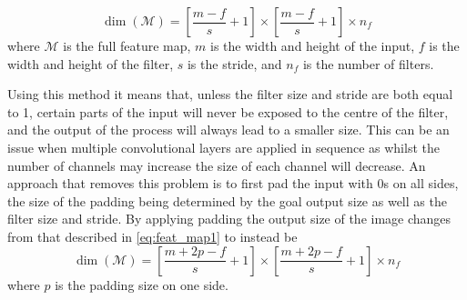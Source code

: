 \documentclass[12pt]{article}
\numberwithin{equation}{section}
\numberwithin{figure}{section}
\begin{document}
\begin{equation}
	\label{eq:feat_map1}
	\dim(\mathscr{M}) = \left[\frac{m-f}{s} +1 \right] \times \left[\frac{m-f}{s} +1 \right] \times n_{f}
\end{equation}
where $\mathscr{M}$ is the full feature map, $m$ is the width and height of the input, $f$ is the width and height of the filter, $s$ is the stride, and $n_f$ is the number of filters.

Using this method it means that, unless the filter size and stride are both equal to 1, certain parts of the input will never be exposed to the centre of the filter, and the output of the process will always lead to a smaller size. This can be an issue when multiple convolutional layers are applied in sequence as whilst the number of channels may increase the size of each channel will decrease. An approach that removes this problem is to first pad the input with 0s on all sides, the size of the padding being determined by the goal output size as well as the filter size and stride. By applying padding the output size of the image changes from that described in \cref{eq:feat_map1} to instead be
\begin{equation}
	\label{eq:feat_map2}
	\dim(\mathscr{M}) = \left[\frac{m+2p-f}{s} +1 \right] \times \left[\frac{m+2p-f}{s} +1 \right] \times n_{f}
\end{equation}
where $p$ is the padding size on one side.
\end{document}
